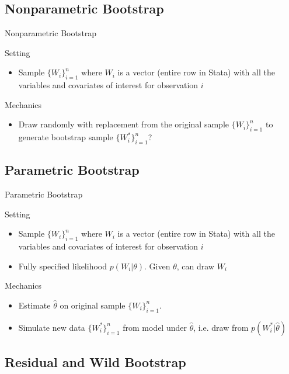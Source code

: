 \documentclass[aspectratio=169, handout]{beamer}
\begin{document}
\subsection{Nonparametric Bootstrap}

{\footnotesize
\begin{frame}{Nonparametric Bootstrap}

Setting
\begin{itemize}
  \item
    \alert{Sample $\{W_i\}_{i=1}^n$} where $W_i$ is a vector (entire row
    in Stata) with all the variables and covariates of interest for
    observation $i$
\end{itemize}
{Mechanics}
\begin{itemize}
  \item Draw randomly with replacement from the original sample
    $\{W_i\}_{i=1}^n$ to generate
    \alert{bootstrap sample $\{W_i^*\}_{i=1}^n$}?
\end{itemize}
\end{frame}
}


\subsection{Parametric Bootstrap}

{\footnotesize
\begin{frame}{Parametric Bootstrap}


Setting
\begin{itemize}
  \item
    \alert{Sample $\{W_i\}_{i=1}^n$} where $W_i$ is a vector (entire row
    in Stata) with all the variables and covariates of interest for
    observation $i$
  \item Fully specified likelihood $p(W_i|\theta)$.
    Given $\theta$, can draw $W_i$
\end{itemize}
{Mechanics}
\begin{itemize}
  \item Estimate $\hat{\theta}$ on original sample $\{W_i\}_{i=1}^n$.
  \item Simulate new data $\{W_i^*\}_{i=1}^n$ from model under
    $\hat{\theta}$, i.e. draw from $p(W_i^*|\hat{\theta})$
\end{itemize}
\end{frame}
}


\subsection{Residual and Wild Bootstrap}
\end{document}
